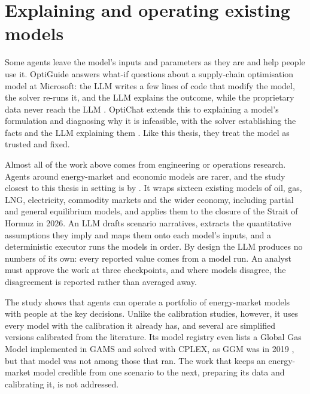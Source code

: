 \section{Explaining and operating existing models}

Some agents leave the model's inputs and parameters as they are and help people use it.
OptiGuide answers what-if questions about a supply-chain optimisation model at Microsoft: the LLM writes a few lines of code that modify the model, the solver re-runs it, and the LLM explains the outcome, while the proprietary data never reach the LLM \citep{li2023large}.
OptiChat extends this to explaining a model's formulation and diagnosing why it is infeasible, with the solver establishing the facts and the LLM explaining them \citep{chen2026optichat}.
Like this thesis, they treat the model as trusted and fixed.

Almost all of the work above comes from engineering or operations research.
Agents around energy-market and economic models are rarer, and the study closest to this thesis in setting is by \citet{golden2026agentic}.
It wraps sixteen existing models of oil, gas, LNG, electricity, commodity markets and the wider economy, including partial and general equilibrium models, and applies them to the closure of the Strait of Hormuz in 2026.
An LLM drafts scenario narratives, extracts the quantitative assumptions they imply and maps them onto each model's inputs, and a deterministic executor runs the models in order.
By design the LLM produces no numbers of its own: every reported value comes from a model run.
An analyst must approve the work at three checkpoints, and where models disagree, the disagreement is reported rather than averaged away.

The study shows that agents can operate a portfolio of energy-market models with people at the key decisions.
Unlike the calibration studies, however, it uses every model with the calibration it already has, and several are simplified versions calibrated from the literature.
Its model registry even lists a Global Gas Model implemented in GAMS and solved with CPLEX, as GGM was in 2019 \citep[p.~37]{egging2019global}, but that model was not among those that ran.
The work that keeps an energy-market model credible from one scenario to the next, preparing its data and calibrating it, is not addressed.

